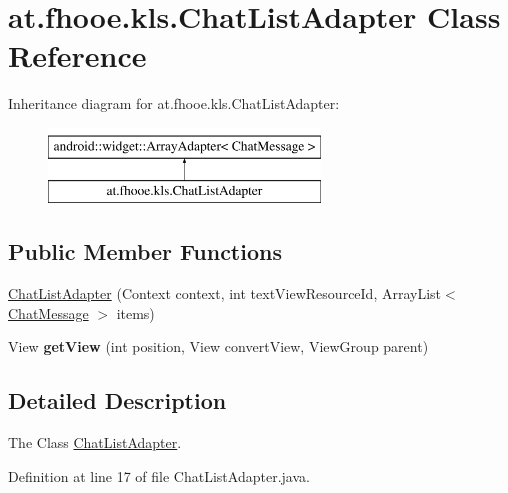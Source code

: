 \hypertarget{classat_1_1fhooe_1_1kls_1_1_chat_list_adapter}{\section{at.\-fhooe.\-kls.\-Chat\-List\-Adapter Class Reference}
\label{classat_1_1fhooe_1_1kls_1_1_chat_list_adapter}
}
Inheritance diagram for at.\-fhooe.\-kls.\-Chat\-List\-Adapter\-:\begin{figure}[H]
\begin{center}
\leavevmode
\includegraphics[height=2.000000cm]{classat_1_1fhooe_1_1kls_1_1_chat_list_adapter}
\end{center}
\end{figure}
\subsection*{Public Member Functions}
\begin{DoxyCompactItemize}
\item 
\hyperlink{classat_1_1fhooe_1_1kls_1_1_chat_list_adapter_aa2b95d273b060f5fa897b9f250e54e58}{Chat\-List\-Adapter} (Context context, int text\-View\-Resource\-Id, Array\-List$<$ \hyperlink{classat_1_1fhooe_1_1kls_1_1_chat_message}{Chat\-Message} $>$ items)
\item 
\hypertarget{classat_1_1fhooe_1_1kls_1_1_chat_list_adapter_a610d3bc4f973496cd0542ed3c47e601d}{View {\bfseries get\-View} (int position, View convert\-View, View\-Group parent)}\label{classat_1_1fhooe_1_1kls_1_1_chat_list_adapter_a610d3bc4f973496cd0542ed3c47e601d}

\end{DoxyCompactItemize}


\subsection{Detailed Description}
The Class \hyperlink{classat_1_1fhooe_1_1kls_1_1_chat_list_adapter}{Chat\-List\-Adapter}. 

Definition at line 17 of file Chat\-List\-Adapter.\-java.



